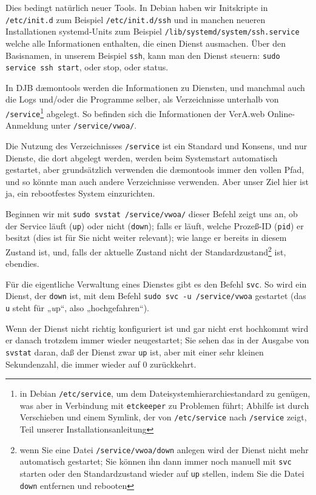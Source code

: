 \documentclass{tarentanleitung}
\begin{document}
Dies bedingt natürlich neuer Tools. In Debian haben wir Initskripte in
\texttt{/etc/init.d} \dash zum Beispiel \texttt{/etc/init.d/ssh} \dash
und in manchen neueren Installationen systemd-Units \dash zum Beispiel
\texttt{/lib/systemd/system/ssh.service} \dash welche alle Informationen
enthalten, die einen Dienst ausmachen. Über den Basisnamen, in unserem
Beispiel \texttt{ssh}, kann man den Dienst steuern: \texttt{sudo service
ssh start}, oder stop, oder status.

In DJB dæmontools werden die Informationen zu Diensten, und manchmal auch
die Logs und/oder die Programme selber, als Verzeichnisse unterhalb von
\texttt{/service}\Hair\footnote{in Debian \texttt{/etc/service}, um dem
Dateisystemhierarchiestandard zu genügen, was aber in Verbindung mit
\texttt{etckeeper} zu Problemen führt; Abhilfe ist durch Verschieben und
einem Symlink, der von \texttt{/etc/service} nach \texttt{/service} zeigt,
Teil unserer Installationsanleitung} abgelegt. So befinden sich die
Informationen der VerA.web Online-Anmeldung unter \texttt{/service/vwoa/}.

Die Nutzung des Verzeichnisses \texttt{/service} ist ein Standard und
Konsens, und nur Dienste, die dort abgelegt werden, werden beim Systemstart
automatisch gestartet, aber grundsätzlich verwenden die dæmontools immer
den vollen Pfad, und so könnte man auch andere Verzeichnisse verwenden.
Aber unser Ziel hier ist ja, ein rebootfestes System einzurichten.

Beginnen wir mit \texttt{sudo svstat /service/vwoa/} \dash dieser Befehl
zeigt uns an, ob der Service läuft (\texttt{up}) oder nicht (\texttt{down});
falls er läuft, welche Prozeß-ID (\texttt{pid}) er besitzt (dies ist für
Sie nicht weiter relevant); wie lange er bereits in diesem Zustand ist,
und, falls der aktuelle Zustand nicht der Standardzustand\Hair\footnote
{wenn Sie eine Datei \texttt{/service/vwoa/down} anlegen wird der Dienst
nicht mehr automatisch gestartet; Sie können ihn dann immer noch manuell
mit \texttt{svc} starten oder den Standardzustand wieder auf \texttt{up}
stellen, indem Sie die Datei \texttt{down} entfernen und rebooten} ist,
ebendies.

Für die eigentliche Verwaltung eines Dienstes gibt es den Befehl
\texttt{svc}. So wird ein Dienst, der \texttt{down} ist, mit dem Befehl
\texttt{sudo svc -u /service/vwoa} gestartet (das \texttt{u} steht für
„\emph{u}p“, also „hochgefahren“).

Wenn der Dienst nicht richtig konfiguriert ist und gar nicht erst hochkommt
wird er danach trotzdem immer wieder neugestartet; Sie sehen das in der
Ausgabe von \texttt{svstat} daran, daß der Dienst zwar \texttt{up} ist,
aber mit einer sehr kleinen Sekundenzahl, die immer wieder auf 0 zurückkehrt.
\end{document}
